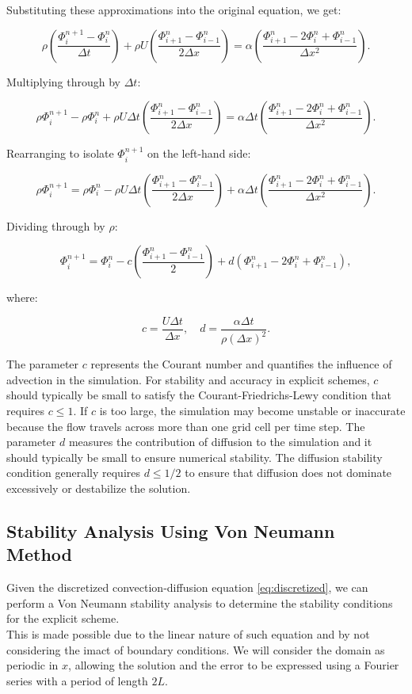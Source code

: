 \documentclass{article}
\begin{document}
Substituting these approximations into the original equation, we get:

\[
\rho \left( \frac{\Phi_i^{n+1} - \Phi_i^n}{\Delta t} \right) + \rho U \left( \frac{\Phi_{i+1}^n - \Phi_{i-1}^n}{2\Delta x} \right) = \alpha \left( \frac{\Phi_{i+1}^n - 2\Phi_i^n + \Phi_{i-1}^n}{\Delta x^2} \right).
\]

Multiplying through by \(\Delta t\):

\[
\rho \Phi_i^{n+1} - \rho \Phi_i^n + \rho U \Delta t \left( \frac{\Phi_{i+1}^n - \Phi_{i-1}^n}{2\Delta x} \right) = \alpha \Delta t \left( \frac{\Phi_{i+1}^n - 2\Phi_i^n + \Phi_{i-1}^n}{\Delta x^2} \right).
\]

Rearranging to isolate \(\Phi_i^{n+1}\) on the left-hand side:

\[
\rho \Phi_i^{n+1} = \rho \Phi_i^n - \rho U \Delta t \left( \frac{\Phi_{i+1}^n - \Phi_{i-1}^n}{2\Delta x} \right) + \alpha \Delta t \left( \frac{\Phi_{i+1}^n - 2\Phi_i^n + \Phi_{i-1}^n}{\Delta x^2} \right).
\]

Dividing through by \(\rho\):

\begin{equation}
  \label{eq:discretized}
\Phi_i^{n+1} = \Phi_i^n - c \left( \frac{\Phi_{i+1}^n - \Phi_{i-1}^n}{2} \right) + d \left( \Phi_{i+1}^n - 2\Phi_i^n + \Phi_{i-1}^n \right),
\end{equation}

where:

\[
c = \frac{U \Delta t}{\Delta x}, \quad d = \frac{\alpha \Delta t}{\rho (\Delta x)^2}.
\]

The parameter $c$ represents the Courant number and quantifies the influence of advection in the simulation. 
For stability and accuracy in explicit schemes, $c$ should typically be small to satisfy the Courant-Friedrichs-Lewy condition that requires $c \leq 1$. 
If $c$ is too large, the simulation may become unstable or inaccurate because the flow travels across more than one grid cell per time step.
The parameter $d$ measures the contribution of diffusion to the simulation and it should typically be small to ensure numerical stability.
The diffusion stability condition generally requires $d \leq 1/2$ to ensure that diffusion does not dominate excessively or destabilize the solution.


\subsection{Stability Analysis Using Von Neumann Method}
Given the discretized convection-diffusion equation \eqref{eq:discretized}, we can perform a Von Neumann stability analysis to determine the stability conditions for the explicit scheme. 
\\This is made possible due to the linear nature of such equation and by not considering the imact of boundary conditions. 
We will consider the domain as periodic in \(x\), allowing the solution and the error to be expressed using a Fourier series with a period of length \(2L\).
\end{document}
